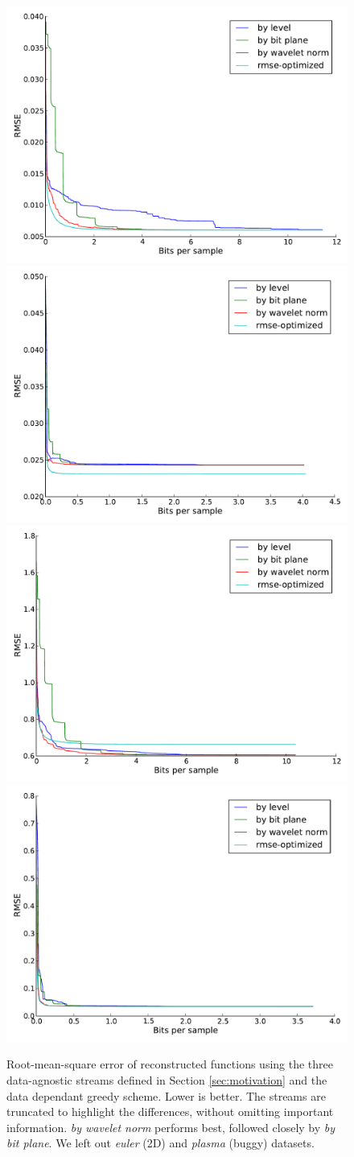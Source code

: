 \begin{figure}
  \centering
        {\includegraphics[width=0.48\linewidth]{img/motivation-3d/rmse-boiler.pdf}}
 	{\includegraphics[width=0.48\linewidth]{img/motivation-3d/rmse-diffusivity.pdf}}
 	{\includegraphics[width=0.48\linewidth]{img/motivation-3d/rmse-turbulence.pdf}}
 	{\includegraphics[width=0.48\linewidth]{img/motivation-3d/rmse-velocityz.pdf}}
 	\caption{Root-mean-square error of reconstructed functions using the three data-agnostic streams
 	defined in Section \ref{sec:motivation} and the data dependant greedy scheme. Lower is better.
        The streams are truncated to highlight
 	the differences, without omitting important information. \emph{by wavelet norm} performs best,
 	followed closely by \emph{by bit plane}. We left out \emph{euler} (2D) and \emph{plasma} (buggy) datasets.
        }
 	\label{fig:motivation-3d-rmse}
\end{figure}


